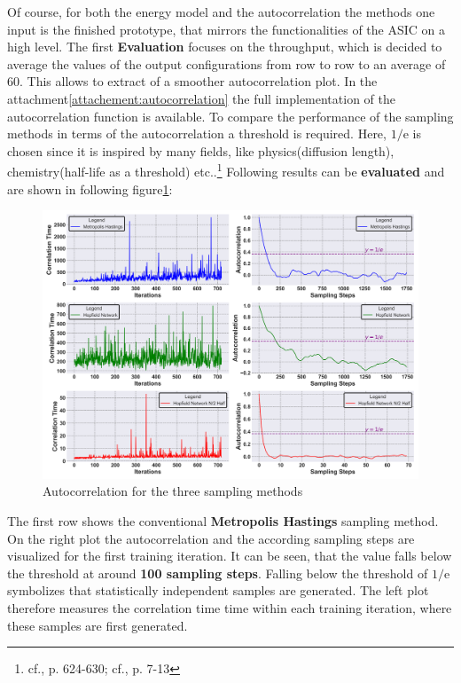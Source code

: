 Of course, for both the energy model and the autocorrelation the methods one input is the finished prototype, that mirrors the functionalities of the \ac{ASIC} on a high level.
The first \textbf{Evaluation} focuses on the throughput, which is decided to average the values of the output configurations from row to row to an average of 60.
This allows to extract of a smoother autocorrelation plot.
In the attachment\ref{attachement:autocorrelation} the full implementation of the autocorrelation function is available.
To compare the performance of the sampling methods in terms of the autocorrelation a threshold is required. 
Here, \(1/\mathrm{e}\) is chosen since it is inspired by many fields, like physics(diffusion length), chemistry(half-life as a threshold) etc..\footnote{cf.\cite{archieStatisticalAnalysisHeterozygosity1985}, p. 624-630; cf.\cite{bohmNoiseinjectedAnalogIsing2022}, p. 7-13}
Following results can be \textbf{evaluated} and are shown in following figure\ref{Autocorr comparison}:
\begin{figure}[H]
    \centering
    \includegraphics[width=0.95\linewidth]{graphics/Visualisierungen_Autocorr_individual_7.png}
    \caption{Autocorrelation for the three sampling methods}
    \label{Autocorr comparison}
\end{figure}
The first row shows the conventional \textbf{Metropolis Hastings} sampling method. On the right plot the autocorrelation
and the according sampling steps are visualized for the first training iteration.
It can be seen, that the value falls below the threshold at around \textbf{100 sampling steps}.
Falling below the threshold of \(1/\mathrm{e}\) symbolizes that statistically independent samples are generated.
The left plot therefore measures the correlation time time within each training iteration, where these samples are first generated. 
